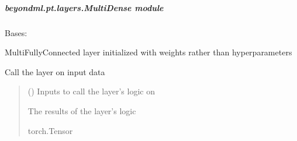 \documentclass[letterpaper,10pt,english]{sphinxmanual}
\begin{document}
\subparagraph{beyondml.pt.layers.MultiDense module}
\label{\detokenize{beyondml.pt.layers:module-beyondml.pt.layers.MultiDense}}\label{\detokenize{beyondml.pt.layers:beyondml-pt-layers-multidense-module}}

\begin{fulllineitems}
\label{\detokenize{beyondml.pt.layers:beyondml.pt.layers.MultiDense.MultiDense}}
\pysigstartsignatures
{}
\pysigstopsignatures
\sphinxAtStartPar
Bases: 

\sphinxAtStartPar
Multi\sphinxhyphen{}Fully\sphinxhyphen{}Connected layer initialized with weights rather than hyperparameters

\begin{fulllineitems}
\label{\detokenize{beyondml.pt.layers:beyondml.pt.layers.MultiDense.MultiDense.forward}}
\pysigstartsignatures
{}
\pysigstopsignatures
\sphinxAtStartPar
Call the layer on input data
\begin{quote}\begin{description}
\sphinxAtStartPar
{} () \textendash{} Inputs to call the layer’s logic on

\sphinxAtStartPar
{} \textendash{} The results of the layer’s logic

\sphinxAtStartPar
torch.Tensor

\end{description}\end{quote}

\end{fulllineitems}


\end{fulllineitems}
\end{document}
